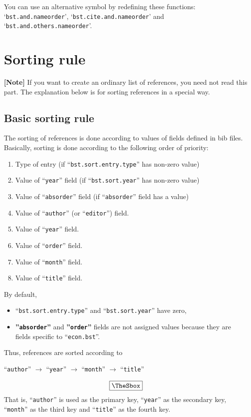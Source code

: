 \documentclass[10pt]{article}
\newenvironment{Frame}%
{\setlength{\fboxsep}{15pt}
\setlength{\mylength}{\linewidth}%
\addtolength{\mylength}{-2\fboxsep}%
\addtolength{\mylength}{-2\fboxrule}%
\Sbox
\minipage{\mylength}%
\setlength{\abovedisplayskip}{0pt}%
\setlength{\belowdisplayskip}{0pt}%
}%
{\endminipage\endSbox
\[\fbox{\TheSbox}\]}
\begin{document}
You can use an alternative symbol by redefining these functions:
`\texttt{bst.and.nameorder}', `\texttt{bst.cite.and.nameorder}' and
`\texttt{bst.and.others.nameorder}'.


\section{Sorting rule}
\label{sec:sort_rule}

\noindent \textbf{[Note]} If you want to create an ordinary list of
references, you need not  read this part.  The explanation below is
for sorting references in a special way.

\subsection{Basic sorting rule}

The sorting of references is done according to values of fields defined
in bib files.  Basically, sorting is done according to the following
order of priority:
\begin{enumerate}
 \item Type of entry (if ``\texttt{bst.sort.entry.type}'' has non-zero value)
 \item Value of ``\texttt{year}'' field (if ``\texttt{bst.sort.year}'' has non-zero value)
 \item Value of ``\texttt{absorder}'' field (if ``\texttt{absorder}'' field has
       a value)
 \item Value of ``\texttt{author}'' (or ``\texttt{editor}'') field.
 \item Value of ``\texttt{year}'' field.
 \item Value of ``\texttt{order}'' field.
 \item Value of ``\texttt{month}'' field.
 \item Value of ``\texttt{title}'' field.
\end{enumerate}

By default, 
\begin{itemize}
 \item ``\texttt{bst.sort.entry.type}'' and ``\texttt{bst.sort.year}'' have
       zero,
 \item \textbf{''\texttt{absorder}''} and \textbf{''\texttt{order}''}
       fields are not assigned values because they are fields specific
       to ``\texttt{econ.bst}''.
\end{itemize}
Thus, references are sorted according to
\begin{Frame}
 \begin{center}
 ``\texttt{author}'' $\rightarrow$ ``\texttt{year}'' $\rightarrow$
 ``\texttt{month}'' $\rightarrow$  ``\texttt{title}'' 
\end{center}
\end{Frame}
That is, ``\texttt{author}'' is used as the primary key, ``\texttt{year}'' as
the secondary key, ``\texttt{month}'' as the third key and ``\texttt{title}'' as
the fourth key.
\end{document}
